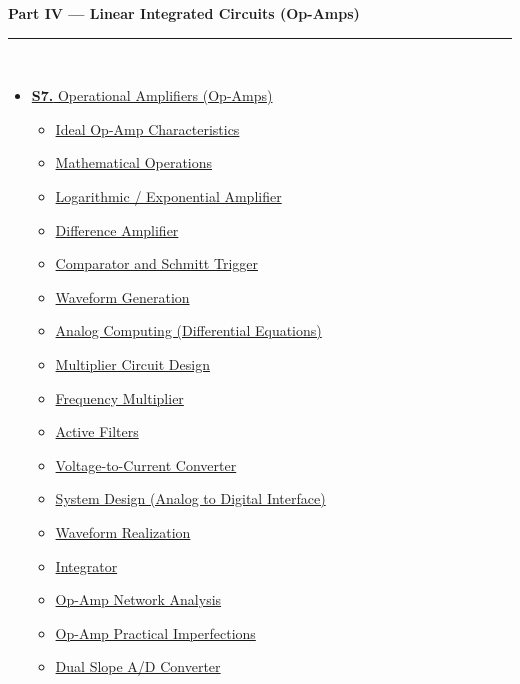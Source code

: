 \documentclass[12pt,a3paper]{article}
\begin{document}
\begin{tcolorbox}[breakable,colback=cE!5,colframe=cE,boxrule=1pt,arc=5pt,
  left=8pt,right=8pt,top=8pt,bottom=8pt,before skip=4pt]
  {\large\bfseries\textcolor{cE}{Part IV --- Linear Integrated Circuits (Op-Amps)}}\\[5pt]
  \textcolor{cE!40}{\rule{\textwidth}{0.4pt}}\\[3pt]
  \small\begin{itemize}[leftmargin=1.2em,itemsep=1pt,label={\textcolor{cE}{$\triangleright$}}]
    \item \hyperref[sec:S7]{\textbf{S7.} Operational Amplifiers (Op-Amps)}
      \begin{itemize}[leftmargin=1.5em,itemsep=0pt,label={\textcolor{cE}{$\cdot$}}]
        \item \hyperref[sub:s7-ideal]{Ideal Op-Amp Characteristics}
        \item \hyperref[sub:s7-math]{Mathematical Operations}
        \item \hyperref[sub:s7-log]{Logarithmic / Exponential Amplifier}
        \item \hyperref[sub:s7-diff]{Difference Amplifier}
        \item \hyperref[sub:s7-schmitt]{Comparator and Schmitt Trigger}
        \item \hyperref[sub:s7-wave]{Waveform Generation}
        \item \hyperref[sub:s7-analog]{Analog Computing (Differential Equations)}
        \item \hyperref[sub:s7-mult]{Multiplier Circuit Design}
        \item \hyperref[sub:s7-freqmult]{Frequency Multiplier}
        \item \hyperref[sub:s7-filters]{Active Filters}
        \item \hyperref[sub:s7-v2i]{Voltage-to-Current Converter}
        \item \hyperref[sub:s7-sysdesign]{System Design (Analog to Digital Interface)}
        \item \hyperref[sub:s7-wavereal]{Waveform Realization}
        \item \hyperref[sub:s7-integrator]{Integrator}
        \item \hyperref[sub:s7-network]{Op-Amp Network Analysis}
        \item \hyperref[sub:s7-imperfections]{Op-Amp Practical Imperfections}
        \item \hyperref[sub:s7-adc]{Dual Slope A/D Converter}
      \end{itemize}
  \end{itemize}
\end{tcolorbox}
\end{document}
